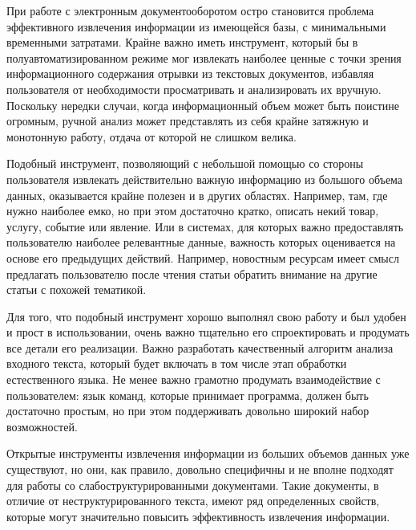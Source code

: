 





\Intro

При работе с электронным документооборотом остро становится проблема эффективного извлечения информации из имеющейся базы, с минимальными временными затратами. Крайне важно иметь инструмент, который бы в полуавтоматизированном режиме мог извлекать наиболее ценные с точки зрения информационного содержания отрывки из текстовых документов, избавляя пользователя от необходимости просматривать и анализировать их вручную. Поскольку нередки случаи, когда информационный объем может быть поистине огромным, ручной анализ может представлять из себя крайне затяжную и монотонную работу, отдача от которой не слишком велика.

Подобный инструмент, позволяющий с небольшой помощью со стороны пользователя извлекать действительно важную информацию из большого объема данных, оказывается крайне полезен и в других областях. Например, там, где нужно наиболее емко, но при этом достаточно кратко, описать некий товар, услугу, событие или явление. Или в системах, для которых важно предоставлять пользователю наиболее релевантные данные, важность которых оценивается на основе его предыдущих действий. Например, новостным ресурсам имеет смысл предлагать пользователю после чтения статьи обратить внимание на другие статьи с похожей тематикой.

Для того, что подобный инструмент хорошо выполнял свою работу и был удобен и прост в использовании, очень важно тщательно его спроектировать и продумать все детали его реализации. Важно разработать качественный алгоритм анализа входного текста, который будет включать в том числе этап обработки естественного языка. Не менее важно грамотно продумать взаимодействие с пользователем: язык команд, которые принимает программа, должен быть достаточно простым, но при этом поддерживать довольно широкий набор возможностей.

Открытые инструменты извлечения информации из больших объемов данных уже существуют, но они, как правило, довольно специфичны и не вполне подходят для работы со слабоструктурированными документами. Такие документы, в отличие от неструктурированного текста, имеют ряд определенных свойств, которые могут значительно повысить эффективность извлечения информации. 

